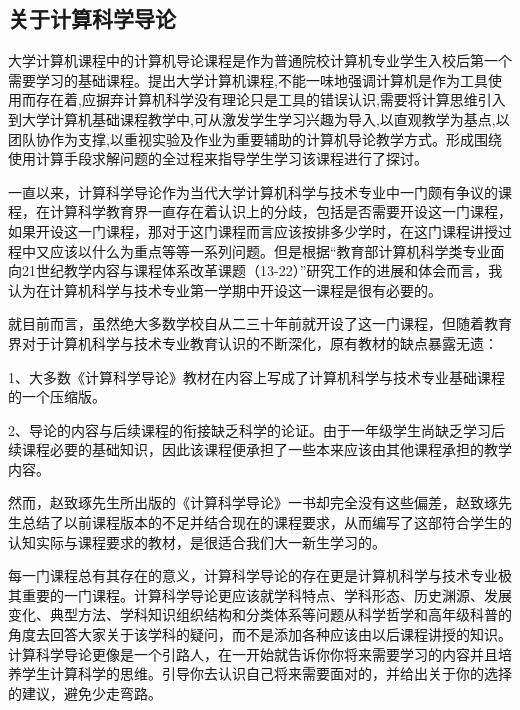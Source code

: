 \documentclass{article}
\begin{document}
\subsection{关于计算科学导论}
大学计算机课程中的计算机导论课程是作为普通院校计算机专业学生入校后第一个需要学习的基础课程。提出大学计算机课程,不能一味地强调计算机是作为工具使用而存在着,应摒弃计算机科学没有理论只是工具的错误认识,需要将计算思维引入到大学计算机基础课程教学中,可从激发学生学习兴趣为导入,以直观教学为基点,以团队协作为支撑,以重视实验及作业为重要辅助的计算机导论教学方式。形成围绕使用计算手段求解问题的全过程来指导学生学习该课程进行了探讨。\par
一直以来，计算科学导论作为当代大学计算机科学与技术专业中一门颇有争议的课程，在计算科学教育界一直存在着认识上的分歧，包括是否需要开设这一门课程，如果开设这一门课程，那对于这门课程而言应该按排多少学时，在这门课程讲授过程中又应该以什么为重点等等一系列问题。但是根据“教育部计算机科学类专业面向21世纪教学内容与课程体系改革课题（13-22）”研究工作的进展和体会而言，我认为在计算机科学与技术专业第一学期中开设这一课程是很有必要的。\par 
就目前而言，虽然绝大多数学校自从二三十年前就开设了这一门课程，但随着教育界对于计算机科学与技术专业教育认识的不断深化，原有教材的缺点暴露无遗：\par 
1、大多数《计算科学导论》教材在内容上写成了计算机科学与技术专业基础课程的一个压缩版。\par 
2、导论的内容与后续课程的衔接缺乏科学的论证。由于一年级学生尚缺乏学习后续课程必要的基础知识，因此该课程便承担了一些本来应该由其他课程承担的教学内容。\par 
然而，赵致琢先生所出版的《计算科学导论》一书却完全没有这些偏差，赵致琢先生总结了以前课程版本的不足并结合现在的课程要求，从而编写了这部符合学生的认知实际与课程要求的教材，是很适合我们大一新生学习的。\citep{f}\par 
每一门课程总有其存在的意义，计算科学导论的存在更是计算机科学与技术专业极其重要的一门课程。计算科学导论更应该就学科特点、学科形态、历史渊源、发展变化、典型方法、学科知识组织结构和分类体系等问题从科学哲学和高年级科普的角度去回答大家关于该学科的疑问，而不是添加各种应该由以后课程讲授的知识。计算科学导论更像是一个引路人，在一开始就告诉你你将来需要学习的内容并且培养学生计算科学的思维。引导你去认识自己将来需要面对的，并给出关于你的选择的建议，避免少走弯路。\par 
\end{document}
